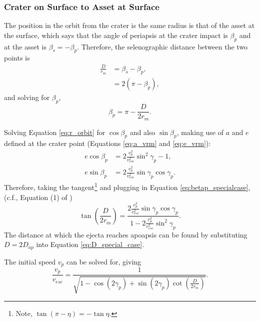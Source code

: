 \documentclass{article}
\begin{document}
\subsubsection{Crater on Surface to Asset at Surface}\label{sssec:Crater on Surface to Observer at Surface}
The position in the orbit from the crater is the same radius is that of the asset at the surface, which says that the angle of periapsis at the crater impact is $\beta_p$ and at the asset is $\beta_s=-\beta_p$. Therefore, the selenographic distance between the two points is
\begin{align}
\frac{D}{r_m} &= \beta_s - \beta_p,\\
&= 2(\pi - \beta_p),
\end{align}
and solving for $\beta_p$,
\begin{equation}\label{eq:betap_specialcase}
\beta_p = \pi - \frac{D}{2r_m}.
\end{equation}

Solving Equation \eqref{eq:r_orbit} for $\cos\beta_p$ and also $\sin\beta_p$, making use of $a$ and $e$ defined at the crater point (Equations \eqref{eq:a_vrm} and \eqref{eq:e_vrm}):
\begin{align}\label{eq:ecosbetap}
e\cos\beta_p &= 2\frac{v_p^2}{v_{esc}^2}\sin^2\gamma_p - 1,\\
e\sin\beta_p &= 2\frac{v_p^2}{v_{esc}^2}\sin\gamma_p\cos\gamma_p.\label{eq:esinbetap}
\end{align}
Therefore, taking the tangent\footnote{Note, $\tan(\pi-\eta) = -\tan\eta$.} and plugging in Equation \eqref{eq:betap_specialcase}, (c.f., Equation (1) of \cite{vickery1986size})
\begin{equation}\label{eq:D_special_case}
\tan\left(\frac{D}{2r_m}\right) = \frac{2\frac{v_p^2}{v_{esc}^2}\sin\gamma_p\cos\gamma_p}{1 - 2\frac{v_p^2}{v_{esc}^2}\sin^2\gamma_p}.
\end{equation}
The distance at which the ejecta reaches apoapsis can be found by substituting $D = 2D_{ap}$ into Equation \eqref{eq:D_special_case}.

The initial speed $v_p$ can be solved for, giving
\begin{equation}\label{eq:vp_special_case}
\frac{v_p}{v_{esc}} = \frac{1}{\sqrt{1-\cos(2\gamma_p) + \sin(2\gamma_p)\cot\left(\frac{D}{2r_m}\right)}}.
\end{equation}
\end{document}
